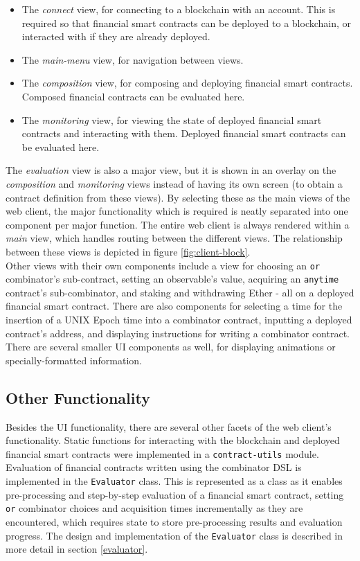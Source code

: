 \begin{itemize}
    \item The \textit{connect} view, for connecting to a blockchain with an account. This is required so that financial smart contracts can be deployed to a blockchain, or interacted with if they are already deployed.
    \item The \textit{main-menu} view, for navigation between views.
    \item The \textit{composition} view, for composing and deploying financial smart contracts. Composed financial contracts can be evaluated here.
    \item The \textit{monitoring} view, for viewing the state of deployed financial smart contracts and interacting with them. Deployed financial smart contracts can be evaluated here. \\
\end{itemize}

The \textit{evaluation} view is also a major view, but it is shown in an overlay on the \textit{composition} and \textit{monitoring} views instead of having its own screen (to obtain a contract definition from these views). By selecting these as the main views of the web client, the major functionality which is required is neatly separated into one component per major function. The entire web client is always rendered within a \textit{main} view, which handles routing between the different views. The relationship between these views is depicted in figure \ref{fig:client-block}. \\

Other views with their own components include a view for choosing an \texttt{or} combinator's sub-contract, setting an observable's value, acquiring an \texttt{anytime} contract's sub-combinator, and staking and withdrawing Ether - all on a deployed financial smart contract. There are also components for selecting a time for the insertion of a UNIX Epoch time into a combinator contract, inputting a deployed contract's address, and displaying instructions for writing a combinator contract. There are several smaller UI components as well, for displaying animations or specially-formatted information.


\subsection{Other Functionality}

Besides the UI functionality, there are several other facets of the web client's functionality. Static functions for interacting with the blockchain and deployed financial smart contracts were implemented in a \texttt{contract-utils} module. Evaluation of financial contracts written using the combinator DSL is implemented in the \texttt{Evaluator} class. This is represented as a class as it enables pre-processing and step-by-step evaluation of a financial smart contract, setting \texttt{or} combinator choices and acquisition times incrementally as they are encountered, which requires state to store pre-processing results and evaluation progress. The design and implementation of the \texttt{Evaluator} class is described in more detail in section \ref{evaluator}.


